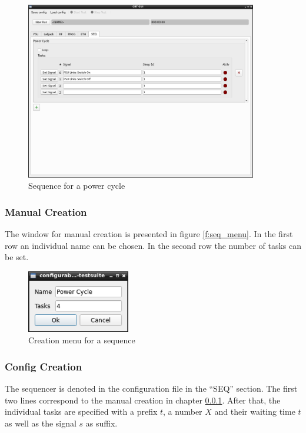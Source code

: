 \documentclass[10pt,a4paper]{article}
\begin{document}
	\begin{figure}[H]
\centering
\includegraphics[width=0.9\textwidth]{./9_SEQ_example.png}
\caption{Sequence for a power cycle}
\label{f:seq_example}
	\end{figure}	 
	
	\subsubsection{Manual Creation}	
	\label{c:seq_manual_creation}
	
	The window for manual creation is presented in figure \eqref{f:seq_menu}. In the first row an individual name can be chosen. In the second row the number of tasks can be set.
	
	\begin{figure}[H]
	\centering
	\includegraphics[width=0.4\textwidth]{./9_SEQ_menu.png}
	\caption{Creation menu for a sequence}
	\label{f:seq_menu}
	\end{figure}
	
	\subsubsection{Config Creation}
	
	The sequencer is denoted in the configuration file in the \enquote{SEQ} section. The first two lines correspond to the manual creation in chapter \ref{c:seq_manual_creation}. After that, the individual tasks are specified with a prefix $t$, a number $X$ and their waiting time $t$ as well as the signal $s$ as suffix.
	
\end{document}
